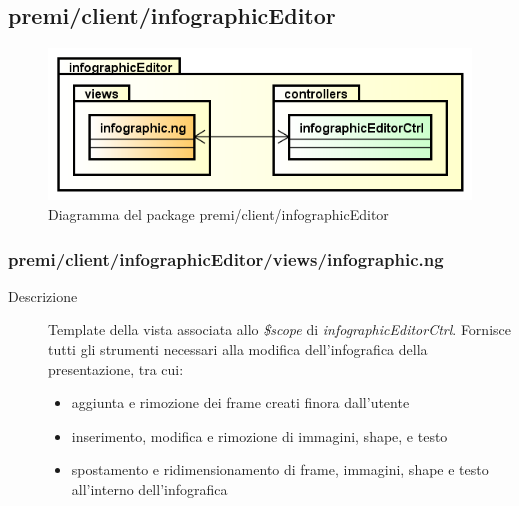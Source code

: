 \clearpage
\subsection{premi/client/infographicEditor}
\begin{figure}[H]
\begin{center}
\includegraphics[scale=0.55]{img/diapkg/infographicEditor.png}
\caption{Diagramma del package premi/client/infographicEditor}
\end{center}
\end{figure}



\subsubsection{premi/client/infographicEditor/views/infographic.ng}

\begin{description}
\item[Descrizione] \hfill
	Template della vista associata allo \textit{\$scope} di \textit{infographicEditorCtrl}. Fornisce tutti gli strumenti necessari alla modifica dell'infografica della presentazione, tra cui:
	\begin{itemize}
			\item aggiunta e rimozione dei frame creati finora dall'utente
			\item inserimento, modifica e rimozione di immagini, shape, e testo
			\item spostamento e ridimensionamento di frame, immagini, shape  e testo all'interno dell'infografica
	\end{itemize}
\end{description}



















